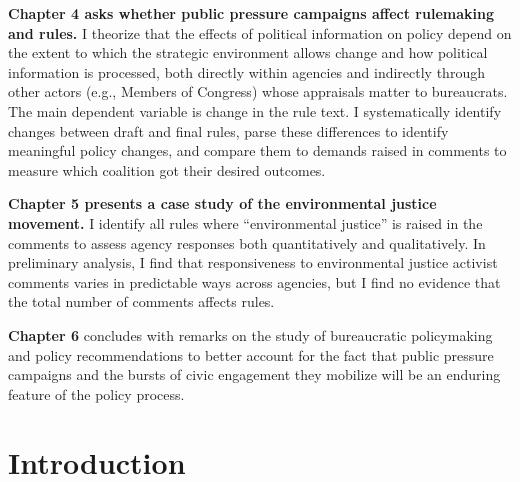 \documentclass[
      12pt,
        ]{article}
\begin{document}
\textbf{Chapter 4 asks whether public pressure campaigns affect rulemaking and rules.}
I theorize that the effects of political information on policy depend on the extent to which the strategic environment allows change and how political information is processed, both directly within agencies and indirectly through other actors (e.g., Members of Congress) whose appraisals matter to bureaucrats.
The main dependent variable is change in the rule text.
I systematically identify changes between draft and final rules, parse these differences to identify meaningful policy changes, and compare them to demands raised in comments to measure which coalition got their desired outcomes.

\textbf{Chapter 5 presents a case study of the environmental justice movement.} I identify all rules where ``environmental justice'' is raised in the comments to assess agency responses both quantitatively and qualitatively. In preliminary analysis, I find that responsiveness to environmental justice activist comments varies in predictable ways across agencies, but I find no evidence that the total number of comments affects rules.

\textbf{Chapter 6} concludes with remarks on the study of bureaucratic policymaking and policy recommendations to better account for the fact that public pressure campaigns and the bursts of civic engagement they mobilize will be an enduring feature of the policy process.

\hypertarget{intro}{%
\section{Introduction}\label{intro}}

\onehalfspacing
\end{document}
